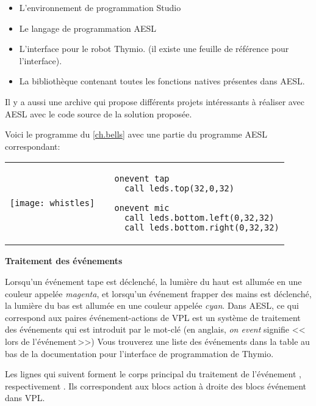 \begin{itemize}
\item L'environnement de programmation Studio
\item Le langage de programmation AESL
\item L'interface pour le robot Thymio.
(il existe une feuille de référence pour l'interface).
\item La bibliothèque contenant toutes les fonctions natives présentes dans AESL.
\end{itemize}

Il y a aussi une archive qui propose différents projets intéressants à réaliser avec AESL
avec le code source de la solution proposée.


Voici le programme  du \cref{ch.bells} avec une partie du programme AESL correspondant:

\begin{center}
\begin{tabular}{ll}
\texttt{[image: whistles]} &
\begin{minipage}[b]{.5\textwidth}
\begin{footnotesize}
\begin{verbatim}
  onevent tap
    call leds.top(32,0,32)
  
  onevent mic
    call leds.bottom.left(0,32,32)
    call leds.bottom.right(0,32,32)
\end{verbatim}
\end{footnotesize}
\vspace*{8ex}
\end{minipage}
\end{tabular}
\end{center}

\textbf{\large Traitement des événements}

Lorsqu'un événement tape est déclenché, la lumière du haut est allumée en une couleur appelée
\emph{magenta},
et lorsqu'un événement frapper des mains est déclenché, la lumière du bas est allumée en une couleur 
appelée \emph{cyan}.
Dans AESL, ce qui correspond aux paires événement-actions de VPL est un système de traitement des événements
qui est introduit par le mot-clé  (en anglais, \emph{on event} signifie <<\,lors de l'événement\,>>)
Vous trouverez une liste des événements dans la table au bas de la documentation pour l'interface
de programmation de Thymio.

Les lignes qui suivent  forment le corps principal du traitement de l'événement , respectivement .
Ils correspondent aux blocs action à droite des blocs événement dans VPL.

